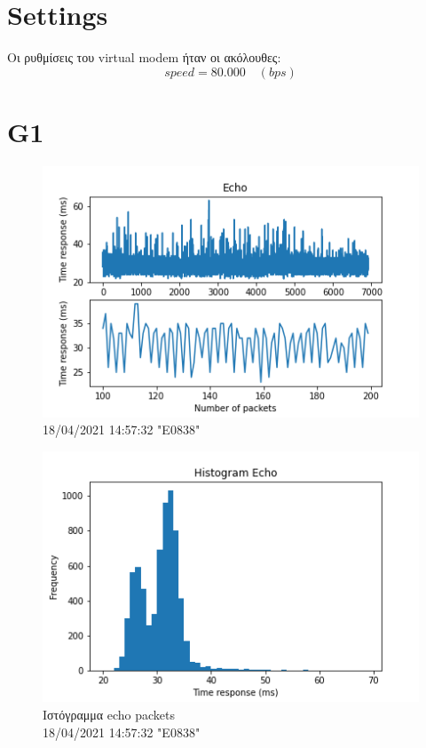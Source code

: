 \documentclass[hidelinks, 12pt, a4paper]{article}
\begin{document}



\pagebreak
{
\renewcommand*\contentsname{Περιεχόμενα}
\hypersetup{linkcolor=black}
\tableofcontents
}
\pagebreak


\section{Settings}

Οι ρυθμίσεις του virtual modem ήταν οι ακόλουθες:
\[speed = 80.000 \quad (bps)\]

\section{G1}

\begin{figure}[h!]
\centering
	\includegraphics[keepaspectratio, width=.7\textwidth]{echo.png}
	\caption{18/04/2021 14:57:32 "E0838"} 
\end{figure}

\begin{figure}[h!]
\centering
	\includegraphics[keepaspectratio, width=.7\textwidth]{hist_echo.png}
	\caption{Ιστόγραμμα echo packets \\ 18/04/2021 14:57:32 "E0838"} 
\end{figure}
\end{document}
